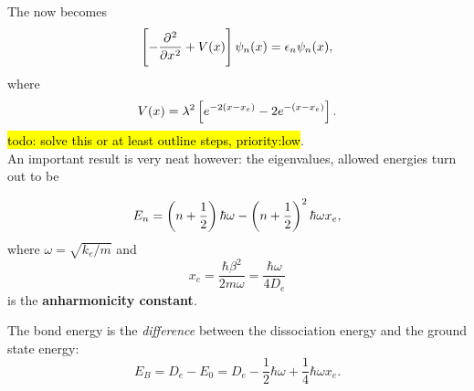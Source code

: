 The \sch now becomes 
\begin{equation}
\lf[-\diffp[2]{}{x}+V(x) \rt]\psi_n(x)=\epsilon_n\psi_n(x),
\end{equation}
where
\begin{equation}
V(x)=\lambda^2\left[e^{-2(x-x_e)}-2e^{-(x-x_e)} \right]. 
\end{equation}
\hl{todo: solve this or at least outline steps, priority:low}. \\
An important result is very neat however: the eigenvalues, \ie allowed energies 
turn out to be 
\begin{prt}
\begin{equation}
E_n=\left(n+\frac{1}{2} \right)\hbar\omega-\left(n+\frac{1}{2} \right)^2\hbar\omega x_e, 
\end{equation}
where $\omega=\sqrt{k_e/m}$ and
\begin{equation}
x_e=\frac{\hbar\beta^2}{2m\omega}=\frac{\hbar\omega}{4D_e}
\end{equation}
is the \textbf{anharmonicity constant}. 
\end{prt}
\begin{prt}
The bond energy is the \textit{difference} between the dissociation energy 
and the ground state energy:
\begin{equation}
E_B=D_e-E_0=D_e-\frac{1}{2}\hbar\omega+\frac{1}{4}\hbar\omega x_e.
\end{equation}
\end{prt}

